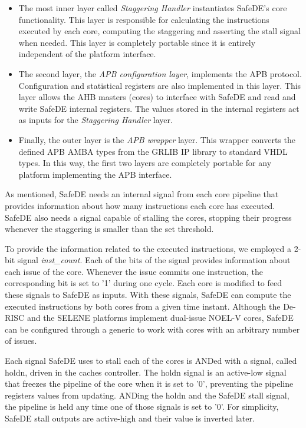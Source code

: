 \begin{itemize}
    \item The most inner layer called \textit{Staggering Handler} instantiates SafeDE's core functionality. This layer is responsible for calculating the instructions executed by each core, computing the staggering and asserting the stall signal when needed. This layer is completely portable since it is entirely independent of the platform interface. 
    \item The second layer, the \textit{APB configuration layer}, implements the APB protocol. Configuration and statistical registers are also implemented in this layer. This layer allows the AHB masters (cores) to interface with SafeDE and read and write SafeDE internal registers. The values stored in the internal registers act as inputs for the \textit{Staggering Handler} layer.
    \item Finally, the outer layer is the \textit{APB wrapper} layer. This wrapper converts the defined APB AMBA types from the GRLIB IP library to standard VHDL types. In this way, the first two layers are completely portable for any platform implementing the APB interface.
\end{itemize}

As mentioned, SafeDE needs an internal signal from each core pipeline that provides information about how many instructions each core has executed. SafeDE also needs a signal capable of stalling the cores, stopping their progress whenever the staggering is smaller than the set threshold. 

To provide the information related to the executed instructions, we employed a 2-bit signal \textit{inst\_count}. Each of the bits of the signal provides information about each issue of the core. Whenever the issue commits one instruction, the corresponding bit is set to '1' during one cycle. Each core is modified to feed these signals to SafeDE as inputs. With these signals, SafeDE can compute the executed instructions by both cores from a given time instant. Although the De-RISC and the SELENE platforms implement dual-issue NOEL-V cores, SafeDE can be configured through a generic to work with cores with an arbitrary number of issues. 

Each signal SafeDE uses to stall each of the cores is ANDed with a signal, called holdn, driven in the caches controller. The holdn signal is an active-low signal that freezes the pipeline of the core when it is set to '0', preventing the pipeline registers values from updating. ANDing the holdn and the SafeDE stall signal, the pipeline is held any time one of those signals is set to '0'. For simplicity, SafeDE stall outputs are active-high and their value is inverted later. 

